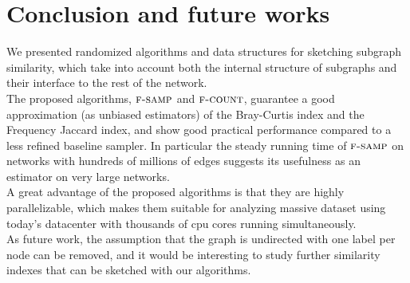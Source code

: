 \chapter{Conclusion and future works}
    

We presented randomized algorithms and data structures for sketching subgraph similarity, 
which take into account both the internal structure of subgraphs and their interface to the rest of the network. \\

The proposed algorithms, $\textsc{f-samp}$ and $\textsc{f-count}$, guarantee a good approximation
(as unbiased estimators) of the Bray-Curtis index and the Frequency
Jaccard index, and show good practical performance compared to a
less refined baseline sampler. In particular the steady running time
of $\textsc{f-samp}$ on networks with hundreds of millions of edges suggests
its usefulness as an estimator on very large networks.\\

A great advantage of the proposed algorithms is that they are highly parallelizable,
which makes them suitable for analyzing massive dataset using today's datacenter with 
thousands of cpu cores running simultaneously.\\

As future work, the assumption that the graph is undirected with one label per
node can be removed, and it would be interesting to study further
similarity indexes that can be sketched with our algorithms.